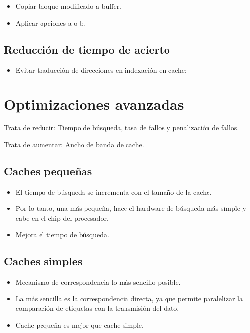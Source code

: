 \documentclass[12pt, twoside, openright]{report} %
\begin{document}
\begin{itemize}
\begin{itemize}
      \begin{itemize}
      
      \item
        Copiar bloque modificado a buffer.
      \item
        Aplicar opciones a o b.
      \end{itemize}
    \end{itemize}
  \end{itemize}

 \subsection{Reducción de tiempo de acierto}

  \begin{itemize}
  
  \item
    Evitar traducción de direcciones en indexación en cache:
  \end{itemize}

  \section{Optimizaciones avanzadas}

    Trata de reducir: Tiempo de búsqueda, tasa de fallos y penalización
    de fallos.

    Trata de aumentar: Ancho de banda de cache.

   \subsection{Caches pequeñas}

    \begin{itemize}
    
    \item
      El tiempo de búsqueda se incrementa con el tamaño de la cache.
    \item
      Por lo tanto, una más pequeña, hace el hardware de búsqueda más
      simple y cabe en el chip del procesador.
    \item
      Mejora el tiempo de búsqueda.
    \end{itemize}

    \subsection{Caches simples}

    \begin{itemize}
    
    \item
      Mecanismo de correspondencia lo más sencillo posible.
    \item
      La más sencilla es la correspondencia directa, ya que permite
      paralelizar la comparación de etiquetas con la transmisión del
      dato.
    \item
      Cache pequeña es mejor que cache simple.
    \end{itemize}
\end{document}

